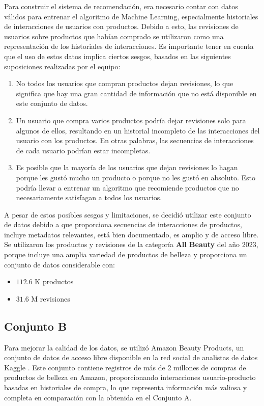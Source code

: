 \documentclass[runningheads]{llncs}
\begin{document}
Para construir el sistema de recomendación, era necesario contar con datos válidos para entrenar el algoritmo de Machine Learning, especialmente historiales de interacciones de usuarios con productos. Debido a esto, las revisiones de usuarios sobre productos que habían comprado se utilizaron como una representación de los historiales de interacciones. Es importante tener en cuenta que el uso de estos datos implica ciertos sesgos, basados en las siguientes suposiciones realizadas por el equipo:
\begin{enumerate}
	\item No todos los usuarios que compran productos dejan revisiones, lo que significa que hay una gran cantidad de información que no está disponible en este conjunto de datos.
	\item Un usuario que compra varios productos podría dejar revisiones solo para algunos de ellos, resultando en un historial incompleto de las interacciones del usuario con los productos. En otras palabras, las secuencias de interacciones de cada usuario podrían estar incompletas.
	\item Es posible que la mayoría de los usuarios que dejan revisiones lo hagan porque les gustó mucho un producto o porque no les gustó en absoluto. Esto podría llevar a entrenar un algoritmo que recomiende productos que no necesariamente satisfagan a todos los usuarios.
\end{enumerate}

A pesar de estos posibles sesgos y limitaciones, se decidió utilizar este conjunto de datos debido a que proporciona secuencias de interacciones de productos, incluye metadatos relevantes, está bien documentado, es amplio y de acceso libre. Se utilizaron los productos y revisiones de la categoría \textbf{All Beauty} del año 2023, porque incluye una amplia variedad de productos de belleza y proporciona un conjunto de datos considerable con:
\begin{itemize}
	\item $112.6$ K productos
	\item $31.6$ M revisiones
\end{itemize}

\subsection{Conjunto B}

Para mejorar la calidad de los datos, se utilizó Amazon Beauty Products, un conjunto de datos de acceso libre disponible en la red social de analistas de datos Kaggle \cite{amazonsales}. Este conjunto contiene registros de más de 2 millones de compras de productos de belleza en Amazon, proporcionando interacciones usuario-producto basadas en historiales de compra, lo que representa información más valiosa y completa en comparación con la obtenida en el Conjunto A.
\end{document}
